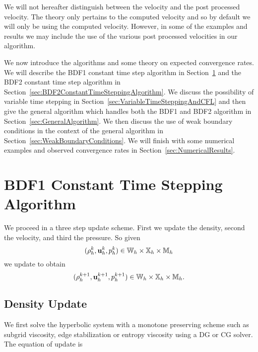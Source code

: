 \documentclass[letterpaper]{erdc}
\begin{document}
\begin{remark}
We will not hereafter distinguish between the velocity and the post processed velocity.  The theory only pertains to the computed velocity and so by default we will only be using the computed velocity.  However, in some of the examples and results we may include the use of the various post processed velocities in our algorithm.
\end{remark}

We now introduce the algorithms and some theory on expected convergence rates.  We will describe the BDF1 constant time step algorithm in Section~\ref{sec:BDF1ConstantTimeSteppingAlgorithm} and the BDF2 constant time step algorithm in Section~\ref{sec:BDF2ConstantTimeSteppingAlgorithm}. We discuss the possibility of variable time stepping in Section~\ref{sec:VariableTimeSteppingAndCFL} and then give the general algorithm which handles both the BDF1 and BDF2 algorithm in Section~\ref{sec:GeneralAlgorithm}.  We then discuss the use of weak boundary conditions in the context of the general algorithm in Section~\ref{sec:WeakBoundaryConditions}.  We will finish with some numerical examples and observed convergence rates in Section~\ref{sec:NumericalResults}.

%
%
%
\section{BDF1 Constant Time Stepping Algorithm}\label{sec:BDF1ConstantTimeSteppingAlgorithm}
We proceed in a three step update scheme.  First we update the density,  second the velocity, and third the pressure.  So given
\begin{equation}(\rho^{k}_h, \textbf{u}^{k}_{h}, p^{k}_h) \in \mathbb{W}_h\times\mathbb{X}_h\times \mathbb{M}_h  \end{equation}
we update to obtain
\begin{equation}(\rho^{k+1}_h, \textbf{u}^{k+1}_{h}, p^{k+1}_h) \in \mathbb{W}_h\times\mathbb{X}_h\times \mathbb{M}_h.\end{equation}

%
%
\subsection{Density Update}

We first solve the hyperbolic system with a monotone preserving scheme such as subgrid viscosity, edge stabilization or entropy viscosity using a DG or CG solver.  The equation of update is
\end{document}
